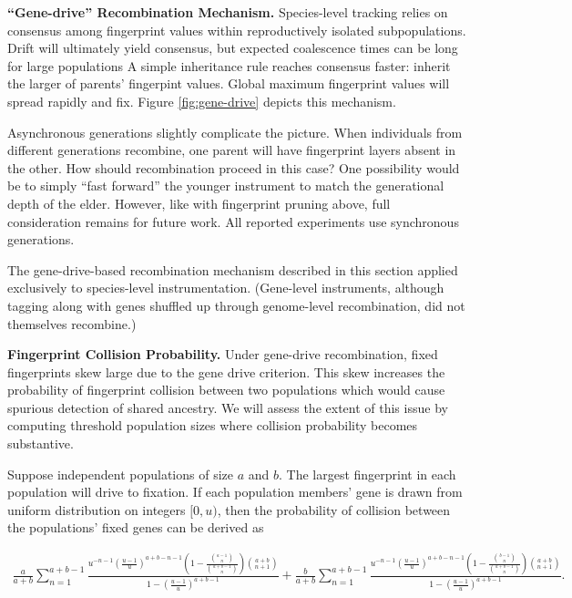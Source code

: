 
\textbf{``Gene-drive'' Recombination Mechanism.}
Species-level tracking relies on consensus among fingerprint values within reproductively isolated subpopulations.
Drift will ultimately yield consensus, but expected coalescence times can be long for large populations
A simple inheritance rule reaches consensus faster: inherit the larger of parents' fingerpint values.
Global maximum fingerprint values will spread rapidly and fix.
Figure \ref{fig:gene-drive} depicts this mechanism.

Asynchronous generations slightly complicate the picture.
When individuals from different generations recombine, one parent will have fingerprint layers absent in the other.
How should recombination proceed in this case?
One possibility would be to simply ``fast forward'' the younger instrument to match the generational depth of the elder.
However, like with fingerprint pruning above, full consideration remains for future work.
All reported experiments use synchronous generations.

The gene-drive-based recombination mechanism described in this section applied exclusively to species-level instrumentation.
(Gene-level instruments, although tagging along with genes shuffled up through genome-level recombination, did not themselves recombine.)

\textbf{Fingerprint Collision Probability.}
Under gene-drive recombination, fixed fingerprints skew large due to the gene drive criterion.
This skew increases the probability of fingerprint collision between two populations which would cause spurious detection of shared ancestry.
We will assess the extent of this issue by computing threshold population sizes where collision probability becomes substantive.

Suppose independent populations of size $a$ and $b$.
The largest fingerprint in each population will drive to fixation.
If each population members' gene is drawn from uniform distribution on integers $[0, u)$, then the probability of collision between the populations' fixed genes can be derived as

\begin{scriptsize}
\begin{align*}
\frac{a}{a + b}\sum_{n=1}^{a + b - 1} \frac{u^{- n - 1} \left(\frac{u - 1}{u}\right)^{a + b - n - 1} \left(1 - \frac{{\binom{a - 1}{n}}}{{\binom{a + b - 1}{n}}} \right) {\binom{a + b}{n + 1}}}{1 - \left(\frac{u - 1}{u}\right)^{a + b - 1}}
+ \frac{b}{a + b} \sum_{n=1}^{a + b - 1} \frac{u^{- n - 1} \left(\frac{u - 1}{u}\right)^{a + b - n - 1} \left(1 - \frac{{\binom{b - 1}{n}}}{{\binom{a + b - 1}{n}}} \right) {\binom{a + b}{n + 1}}}{1 - \left(\frac{u - 1}{u}\right)^{a + b - 1}}.
\end{align*}
\end{scriptsize}


